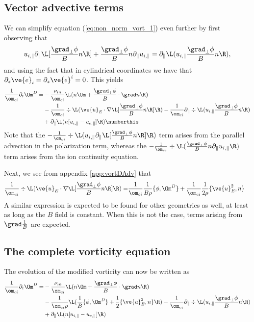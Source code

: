 \subsection{Vector advective terms}
\label{sec:vecAdvTerm}
%
We can simplify equation (\ref{eq:non_norm_vort_1}) even further by first
observing that
%
\begin{align*}
u_{i,\|}\partial_\|\L[\frac{\grad_\perp \phi}{B}n\R]
+ \frac{\grad_\perp \phi}{B} n \partial_\| u_{i,\|}
=
\partial_\| \L( u_{i,\|}\frac{\grad_\perp \phi}{B}n \R),
\end{align*}
%
and using the fact that in cylindrical coordinates we have that
$\partial_z \ve{e}_i = \partial_z \ve{e}^i = 0$. This yields
%
\begin{align*}
  \frac{1}{\om_{ci}}
  \partial_t \Om^D
  =&
  - \frac{\nu_{in}}{\om_{ci}} \L(n\Om + \frac{\grad_\perp \phi}{B} \cdot \grad n\R)
  \\
  &
  - \frac{1}{\om_{ci}} \div
 \L(
 \ve{u}_E\cdot\nabla \L[\frac{\grad_\perp \phi}{B}n \R]
 \R)
  - \frac{1}{\om_{ci}} \partial_\|\div
 \L( u_{i,\|}\frac{\grad_\perp \phi}{B}n \R)
 \\
 &
 + \partial_\| \L(n [u_{i,\|} - u_{e,\|}]\R)
 \numberthis
 \label{eq:non_norm_vort_2}
\end{align*}
%
Note that the
%
$ - \frac{1}{\om_{ci}} \div
\L( u_{i,\|}\partial_\|\L[\frac{\grad_\perp \phi}{B}n\R] \R) $
%
term arises from the parallel advection in the polarization term, whereas the
%
$ - \frac{1}{\om_{ci}} \div
 \L( \frac{\grad_\perp \phi}{B} n \partial_\| u_{i,\|} \R) $
%
term arises from the ion continuity equation.

Next, we see from appendix \ref{app:vortDAdv} that
%
\begin{align*}
 \frac{1}{\om_{ci}}
  \div
  \L( \ve{u}_E\cdot\nabla \L[\frac{\grad_\perp \phi}{B}n \R]\R)
  =&
  \frac{1}{\om_{ci}}
  \frac{1}{B\rho}\{\phi, \Om^D\}
  +
  \frac{1}{\om_{ci}}
  \frac{1}{2\rho}\{\ve{u}_E^2, n\}
\end{align*}
%
A similar expression is expected to be found for other geometries as well, at
least as long as the $B$ field is constant. When this is not the case, terms
arising from $\grad \frac{1}{B}$ are expected.


\subsection{The complete vorticity equation}
%
The evolution of the modified vorticity can now be written as
%
\begin{align*}
  \frac{1}{\om_{ci}}
  \partial_t \Om^D
  =&
  - \frac{\nu_{in}}{\om_{ci}} \L(n\Om + \frac{\grad_\perp \phi}{B} \cdot \grad n\R)
  \\
  &
  -
 \frac{1}{\om_{ci}\rho}
 \L(
  \frac{1}{B}\{\phi, \Om^D\}
  +
  \frac{1}{2}\{\ve{u}_E^2, n\}
 \R)
  -
 \frac{1}{\om_{ci}} \partial_\|\div
 \L( u_{i,\|}\frac{\grad_\perp \phi}{B}n \R)
 \\
 &
 + \partial_\| \L(n [u_{i,\|} - u_{e,\|}]\R)
\end{align*}
